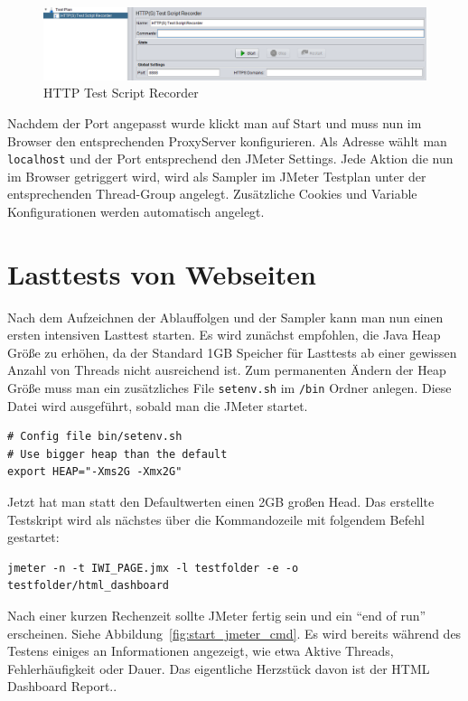 \documentclass[a4paper,12pt]{article}
\newcommand{\codeInLine}[1]{%
\colorbox{graybackgroundColor}{\lstinline{#1}} %
}
\begin{document}
\begin{figure}[htb]%
 \centering
    \includegraphics[width=1\textwidth]{bilder/https_recorder.png}
  \caption{HTTP Test Script Recorder}
  \label{fig:https_recorder}
\end{figure}

Nachdem der Port angepasst wurde klickt man auf Start und muss nun im Browser den entsprechenden ProxyServer konfigurieren. Als Adresse wählt man \codeInLine{localhost} und der Port entsprechend den JMeter Settings. Jede Aktion die nun im Browser getriggert wird, wird als Sampler im JMeter Testplan unter der entsprechenden Thread-Group angelegt. Zusätzliche Cookies und Variable Konfigurationen werden automatisch angelegt.

\section{Lasttests von Webseiten}
Nach dem Aufzeichnen der Ablauffolgen und der Sampler kann man nun einen ersten intensiven Lasttest starten. Es wird zunächst empfohlen, die Java Heap Größe zu erhöhen, da der Standard 1GB Speicher für Lasttests ab einer gewissen Anzahl von Threads nicht ausreichend ist. Zum permanenten Ändern der Heap Größe muss man ein zusätzliches File \codeInLine{setenv.sh} im \codeInLine{/bin} Ordner anlegen. Diese Datei wird ausgeführt, sobald man die JMeter startet. 

\begin{lstlisting}
# Config file bin/setenv.sh
# Use bigger heap than the default
export HEAP="-Xms2G -Xmx2G"
\end{lstlisting}

Jetzt hat man statt den Defaultwerten einen 2GB großen Head. Das erstellte Testskript wird als nächstes über die Kommandozeile mit folgendem Befehl gestartet:

\begin{lstlisting}
jmeter -n -t IWI_PAGE.jmx -l testfolder -e -o testfolder/html_dashboard
\end{lstlisting} 

Nach einer kurzen Rechenzeit sollte JMeter fertig sein und ein "`end of run"' erscheinen. Siehe Abbildung~\ref{fig:start_jmeter_cmd}. Es wird bereits während des Testens einiges an Informationen angezeigt, wie etwa Aktive Threads, Fehlerhäufigkeit oder Dauer. Das eigentliche Herzstück davon ist der HTML Dashboard Report..
\end{document}
